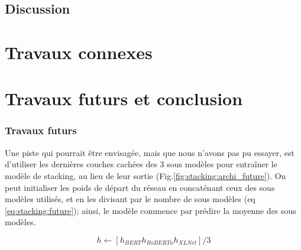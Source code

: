 \documentclass[11pt,a4paper, french]{article}
\begin{document}
\subsection{Discussion}


\section{Travaux connexes}



\section{Travaux futurs et conclusion }

%
\subsubsection{Travaux futurs}

Une piste qui pourrait être envisagée, mais que nous n'avons pas pu essayer, est d'utiliser les dernières couches cachées des 3 sous modèles pour entraîner le modèle de stacking, au lieu de leur sortie (Fig.\ref{fig:stacking:archi_future}). On peut initialiser les poids de départ du réseau en concaténant ceux des sous modèles utilisés, et en les divisant par le nombre de sous modèles (eq \ref{eq:stacking:future}); ainsi, le modèle commence par prédire la moyenne des sous modèles.

\begin{equation}
  h \leftarrow [h_{BERT} h_{RoBERTa} h_{XLNet}] / 3 \label{eq:stacking:future}
\end{equation}
\end{document}

